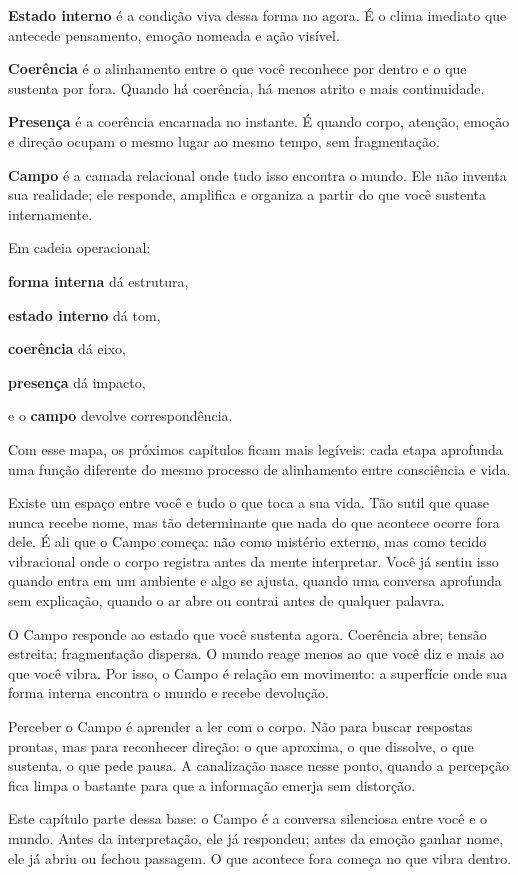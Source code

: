 \documentclass[12pt]{book}
\begin{document}
\textbf{Estado interno} é a condição viva dessa forma no agora. É o clima imediato que antecede pensamento, emoção nomeada e ação visível.

\textbf{Coerência} é o alinhamento entre o que você reconhece por dentro e o que sustenta por fora. Quando há coerência, há menos atrito e mais continuidade.

\textbf{Presença} é a coerência encarnada no instante. É quando corpo, atenção, emoção e direção ocupam o mesmo lugar ao mesmo tempo, sem fragmentação.

\textbf{Campo} é a camada relacional onde tudo isso encontra o mundo. Ele não inventa sua realidade; ele responde, amplifica e organiza a partir do que você sustenta internamente.

Em cadeia operacional:

\textbf{forma interna} dá estrutura,

\textbf{estado interno} dá tom,

\textbf{coerência} dá eixo,

\textbf{presença} dá impacto,

e o \textbf{campo} devolve correspondência.

Com esse mapa, os próximos capítulos ficam mais legíveis: cada etapa aprofunda uma função diferente do mesmo processo de alinhamento entre consciência e vida.

Existe um espaço entre você e tudo o que toca a sua vida. Tão sutil que quase nunca recebe nome, mas tão determinante que nada do que acontece ocorre fora dele. É ali que o Campo começa: não como mistério externo, mas como tecido vibracional onde o corpo registra antes da mente interpretar. Você já sentiu isso quando entra em um ambiente e algo se ajusta, quando uma conversa aprofunda sem explicação, quando o ar abre ou contrai antes de qualquer palavra.

O Campo responde ao estado que você sustenta agora. Coerência abre; tensão estreita; fragmentação dispersa. O mundo reage menos ao que você diz e mais ao que você vibra. Por isso, o Campo é relação em movimento: a superfície onde sua forma interna encontra o mundo e recebe devolução.

Perceber o Campo é aprender a ler com o corpo. Não para buscar respostas prontas, mas para reconhecer direção: o que aproxima, o que dissolve, o que sustenta, o que pede pausa. A canalização nasce nesse ponto, quando a percepção fica limpa o bastante para que a informação emerja sem distorção.

Este capítulo parte dessa base: o Campo é a conversa silenciosa entre você e o mundo. Antes da interpretação, ele já respondeu; antes da emoção ganhar nome, ele já abriu ou fechou passagem. O que acontece fora começa no que vibra dentro.
\end{document}
